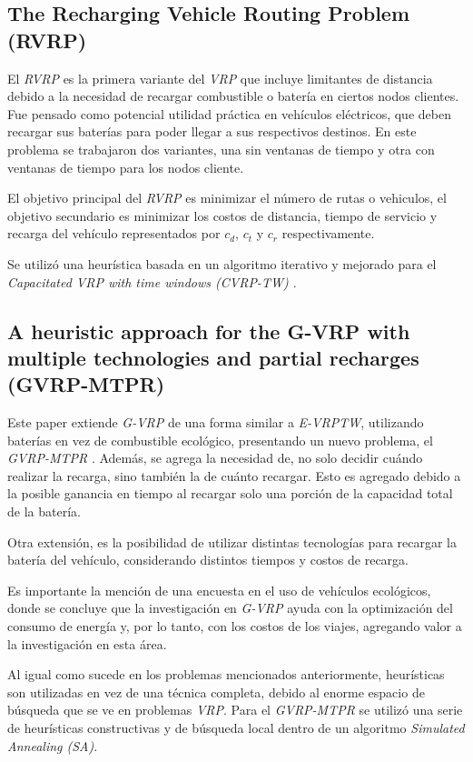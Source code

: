 \documentclass[letter, 10pt]{article}
\begin{document}
\subsection{The Recharging Vehicle Routing Problem (RVRP)} 
El \textit{RVRP} \cite{RVRP} es la primera variante del \textit{VRP} que incluye limitantes de distancia debido a la necesidad
de recargar combustible o batería en ciertos nodos clientes. Fue pensado como potencial utilidad práctica en
vehículos eléctricos, que deben recargar sus baterías para poder llegar a sus respectivos destinos.
En este problema se trabajaron dos variantes, una sin ventanas de tiempo y otra con ventanas de tiempo para los
nodos cliente.

El objetivo principal del \textit{RVRP} es minimizar el número de rutas o vehiculos,
 el objetivo secundario es minimizar los costos de distancia, tiempo de servicio y 
 recarga del vehículo representados por \(c_d\), \(c_t\) y \(c_r\) respectivamente.
 
 Se utilizó una heurística basada en un algoritmo iterativo y mejorado para el 
 \textit{Capacitated VRP with time windows (CVRP-TW) \cite{CVRP-TW}}.

\subsection{A heuristic approach for the G-VRP with multiple technologies and partial recharges (GVRP-MTPR)}
Este paper extiende \textit{G-VRP} de una forma similar a \textit{E-VRPTW}, utilizando baterías en vez de combustible
ecológico, presentando un nuevo problema, el \textit{GVRP-MTPR} \cite{GVRP2}. Además, se agrega la necesidad de, no solo decidir cuándo
realizar la recarga, sino también la de cuánto recargar. Esto es agregado debido a la posible ganancia en
tiempo al recargar solo una porción de la capacidad total de la batería.

Otra extensión, es la posibilidad de utilizar distintas tecnologías para recargar la batería del 
vehículo, considerando distintos tiempos y costos de recarga.

Es importante la mención de una encuesta \cite{Survey} en el uso de vehículos 
ecológicos, donde se concluye que la investigación en \textit{G-VRP} ayuda con la optimización
 del consumo de energía y, por lo tanto, con los costos de los viajes, agregando valor a la
 investigación en esta área.
 
 Al igual como sucede en los problemas mencionados anteriormente, heurísticas son utilizadas en vez
 de una técnica completa, debido al enorme espacio de búsqueda que se ve en problemas \textit{VRP}. Para el 
 \textit{GVRP-MTPR} se utilizó una serie de heurísticas constructivas y de búsqueda local dentro de un algoritmo
 \textit{Simulated Annealing (SA)}.
\end{document}
